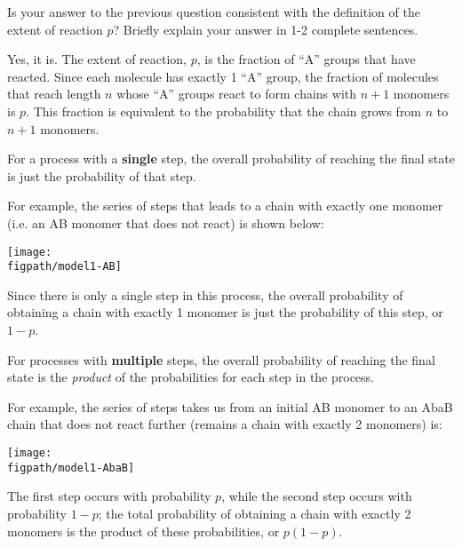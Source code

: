 \begin{activity}
\begin{ctqs}
	\question Is your answer to the previous question consistent with the definition of the extent of reaction $p$?  Briefly explain your answer in 1-2 complete sentences.
	
		\begin{solution}[2in]
			Yes, it is.  The extent of reaction, $p$, is the fraction of ``A'' groups that have reacted.  Since each molecule has exactly 1 ``A'' group, the fraction of molecules that reach length $n$ whose ``A'' groups react to form chains with $n+1$ monomers is $p$.  This fraction is equivalent to the probability that the chain grows from $n$ to $n+1$ monomers.
		\end{solution}
	
\end{ctqs}

\begin{infobox}

	For a process with a \textbf{single} step, the overall probability of reaching the final state is just the probability of that step.
	
	For example, the series of steps that leads to a chain with exactly one monomer (i.e. an AB monomer that does not react) is shown below:
	
	\vspace{0.1in}
	\centerline{\texttt{[image: \\figpath/model1-AB]}}
	
	Since there is only a single step in this process, the overall probability of obtaining a chain with exactly 1 monomer is just the probability of this step, or $1-p$.
	
	\vspace{0.1in}
	For processes with \textbf{multiple} steps, the overall probability of reaching the final state is the \emph{product} of the probabilities for each step in the process.
	
	For example, the series of steps takes us from an initial AB monomer to an AbaB chain that does not react further (remains a chain with exactly 2 monomers) is:
	
	\vspace{0.1in}
	\centerline{\texttt{[image: \\figpath/model1-AbaB]}}
	
	The first step occurs with probability $p$, while the second step occurs with probability $1-p$; the total probability of obtaining a chain with exactly 2 monomers is the product of these probabilities, or $p(1-p)$.
	
\end{infobox}


\end{activity}
